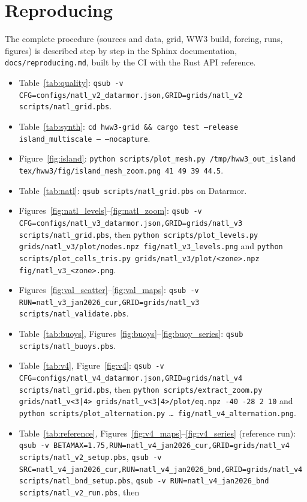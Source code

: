 \documentclass[11pt,a4paper]{article}
\begin{document}
\appendix
\section{Reproducing}
The complete procedure (sources and data, grid, WW3 build, forcing, runs,
figures) is described step by step in the Sphinx documentation,
\texttt{docs/reproducing.md}, built by the CI with the Rust API reference.
\begin{itemize}
\item Table~\ref{tab:quality}: \texttt{qsub -v CFG=configs/natl\_v2\_datarmor.json,GRID=grids/natl\_v2 scripts/natl\_grid.pbs}.
\item Table~\ref{tab:synth}: \texttt{cd hww3-grid \&\& cargo test --release island\_multiscale -- --nocapture}.
\item Figure~\ref{fig:island}: \texttt{python scripts/plot\_mesh.py /tmp/hww3\_out\_island tex/hww3/fig/island\_mesh\_zoom.png 41 49 39 44.5}.
\item Table~\ref{tab:natl}: \texttt{qsub scripts/natl\_grid.pbs} on Datarmor.
\item Figures~\ref{fig:natl_levels}--\ref{fig:natl_zoom}:
  \texttt{qsub -v CFG=configs/natl\_v3\_datarmor.json,GRID=grids/natl\_v3 scripts/natl\_grid.pbs}, then
  \texttt{python scripts/plot\_levels.py grids/natl\_v3/plot/nodes.npz fig/natl\_v3\_levels.png} and
  \texttt{python scripts/plot\_cells\_tris.py grids/natl\_v3/plot/<zone>.npz fig/natl\_v3\_<zone>.png}.
\item Figures~\ref{fig:val_scatter}--\ref{fig:val_maps}:
  \texttt{qsub -v RUN=natl\_v3\_jan2026\_cur,GRID=grids/natl\_v3 scripts/natl\_validate.pbs}.
\item Table~\ref{tab:buoys}, Figures~\ref{fig:buoys}--\ref{fig:buoy_series}:
  \texttt{qsub scripts/natl\_buoys.pbs}.
\item Table~\ref{tab:v4}, Figure~\ref{fig:v4}:
  \texttt{qsub -v CFG=configs/natl\_v4\_datarmor.json,GRID=grids/natl\_v4 scripts/natl\_grid.pbs}, then
  \texttt{python scripts/extract\_zoom.py grids/natl\_v<3|4> grids/natl\_v<3|4>/plot/eq.npz -40 -28 2 10} and
  \texttt{python scripts/plot\_alternation.py \ldots{} fig/natl\_v4\_alternation.png}.
\item Table~\ref{tab:reference}, Figures~\ref{fig:v4_maps}--\ref{fig:v4_series}
  (reference run): \texttt{qsub -v BETAMAX=1.75,RUN=natl\_v4\_jan2026\_cur,GRID=grids/natl\_v4 scripts/natl\_v2\_setup.pbs},
  \texttt{qsub -v SRC=natl\_v4\_jan2026\_cur,RUN=natl\_v4\_jan2026\_bnd,GRID=grids/natl\_v4 scripts/natl\_bnd\_setup.pbs},
  \texttt{qsub -v RUN=natl\_v4\_jan2026\_bnd scripts/natl\_v2\_run.pbs}, then

\end{itemize}
\end{document}
